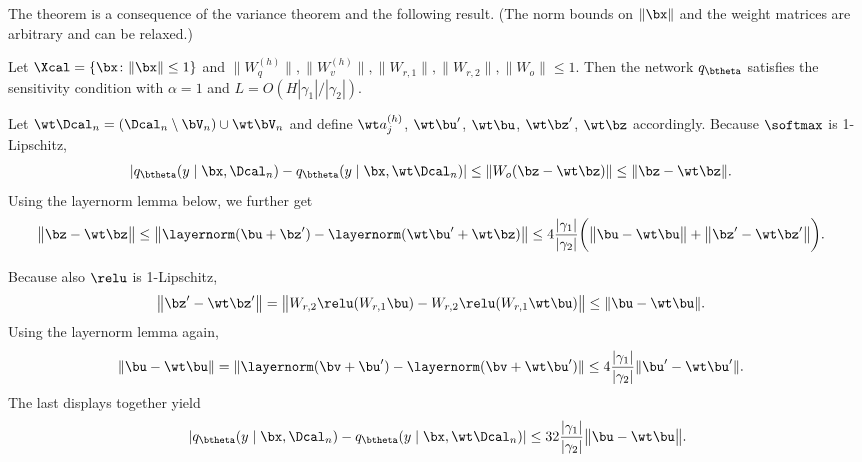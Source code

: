 \documentclass[aspectratio=169,10pt]{beamer}
\newcommand{\currentheading}{\ifx\insertsubsection\empty\insertsection\else\insertsubsection\fi}
\begin{document}
\begin{frame}{\currentheading}
The theorem is a consequence of the variance theorem and the following result. (The norm bounds on $\|\bx\|$ and the weight matrices are arbitrary and can be relaxed.)
\begin{theorem}[A.1]\label{thm:transformer-bdiff}
Let $\Xcal = \{\bx\colon \|\bx\| \le 1\}$ and $\|W_{q}^{(h)}\|, \|W_{v}^{(h)}\|,  \|W_{r, 1}\|, \|W_{r, 2}\|, \|W_o\| \le 1$. Then the network $q_{\btheta}$ satisfies the sensitivity condition with $\alpha = 1$ and $L = O(H|\gamma_1| / |\gamma_2|)$.
\end{theorem}
\end{frame}

\begin{frame}{\currentheading}
\small
Let $\wt \Dcal_n = (\Dcal_n \setminus \bV_n) \cup \wt \bV_n$ and define $\wt a_j^{(h)}$, $\wt \bu'$, $\wt \bu$, $\wt \bz'$, $\wt \bz$ accordingly. Because $\softmax$ is 1-Lipschitz,
\begin{align*}
	|q_{\btheta}(y \mid \bx, \Dcal_n) - q_{\btheta}(y \mid \bx, \wt \Dcal_n)| & \le \| W_o (\bz - \wt \bz)\|
	\le \| \bz - \wt \bz\|.
\end{align*}
Using the layernorm lemma below, we further get
\begin{align*}
	\bigl\| \bz - \wt \bz\bigr\| & \le \bigl\| \layernorm(\bu + \bz') - \layernorm(\wt \bu' + \wt \bz)\bigr\|  \le 4 \frac{|\gamma_1|}{|\gamma_2|}  \biggl(\bigl\|\bu - \wt \bu\bigr\|  + \bigl\|\bz'- \wt \bz'\bigr\| \biggr).
\end{align*}
\end{frame}

\begin{frame}{\currentheading}
\small
Because also $\relu$ is 1-Lipschitz,
\begin{align*}
	\bigl\|\bz'- \wt \bz'\bigr\| & = \bigl\|W_{r, 2}\relu(W_{r, 1}\bu)- W_{r, 2}\relu(W_{r, 1}\wt \bu)\bigr\|  \le \|\bu - \wt \bu\|.
\end{align*}
Using the layernorm lemma again,
\begin{align*}
	\| \bu - \wt \bu\|
	 & = \| \layernorm(\bv + \bu') - \layernorm(\bv + \wt \bu')\| \le 4\frac{|\gamma_1|}{|\gamma_2|} \| \bu' - \wt  \bu'\|.
\end{align*}
The last displays together yield
\begin{align*}
	|q_{\btheta}(y \mid \bx, \Dcal_n) - q_{\btheta}(y \mid \bx, \wt \Dcal_n)| \le 32 \frac{|\gamma_1|}{|\gamma_2|} \bigl\|\bu - \wt \bu\bigr\|.
\end{align*}
\end{frame}
\end{document}
